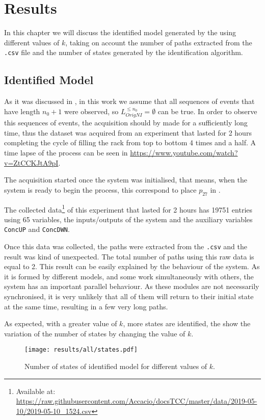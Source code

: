 \chapter{Results}
\label{cha:results}
In this chapter we will discuss the identified model generated by the
 using different values of $k$, taking
on account the number of paths extracted from the \verb|.csv| file and the
number of states generated by the identification algorithm.

\section{Identified Model}
As it was discussed in , in this work we assume that all
sequences of events that have length $n_0+1$ were observed, so 
$L_{OrigNI}^{\leq n_0}=\emptyset$ can be true. In order to observe this
sequences of events, the acquisition should by made for a sufficiently
long time, thus the dataset was acquired from an experiment that lasted for 2
hours completing the cycle of filling the rack from top to bottom  4 times and a
half. A time lapse of the process can be seen in
\url{https://www.youtube.com/watch?v=ZtCCKJtA9pI}.

The acquisition started once the system was initialised, that means,
when the system is ready to begin the process, this correspond to place
\hyperlink{partialTable:p27}{$p_{27}$} in .

The collected data\footnote{Available at:
  \url{https://raw.githubusercontent.com/Accacio/docsTCC/master/data/2019-05-10/2019-05-10_1524.csv}}
of this experiment that lasted for 2 hours has 19751 entries using 65
variables, the inputs\slash outputs of the system and the auxiliary variables
\verb|ConcUP| and \verb|ConcDWN|.

Once this data was collected, the paths were extracted from the \verb|.csv| and the
result was kind of unexpected. The total number of paths using this raw data is equal to
2. This result can be easily explained by the behaviour of the system. As it is
formed by different models, and some work simultaneously with others, the system
has an important parallel behaviour. As these modules are not necessarily
synchronised, it is very unlikely that all of them will return to their initial
state at the same time, resulting in a few very long paths. 


As expected, with a greater value of $k$, more states are identified, the
 show the variation of the number of
states by changing the value of $k$.
\begin{figure}[H]
  \centering
  \texttt{[image: results/all/states.pdf]}
  \caption{Number of states of identified model for different values of $k$.}
    \label{fig:statesIdentOriginal}
\end{figure}

